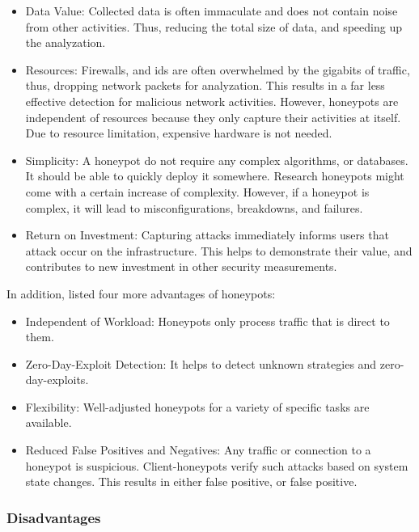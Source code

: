 \begin{itemize}
    \item Data Value: Collected data is often immaculate and does not contain noise from other activities.
          Thus, reducing the total size of data, and speeding up the analyzation.
    \item Resources: Firewalls, and \ac{ids} are often overwhelmed by the gigabits of traffic, thus, dropping network packets for analyzation.
          This results in a far less effective detection for malicious network activities.
          However, honeypots are independent of resources because they only capture their activities at itself.
          Due to resource limitation, expensive hardware is not needed.
    \item Simplicity: A honeypot do not require any complex algorithms, or databases.
          It should be able to quickly deploy it somewhere.
          Research honeypots might come with a certain increase of complexity. However, if a honeypot is complex, it will lead to misconfigurations, breakdowns, and failures.
    \item Return on Investment: Capturing attacks immediately informs users that attack occur on the infrastructure.
          This helps to demonstrate their value, and contributes to new investment in other security measurements.
\end{itemize}

In addition, \citet{NawrockiWSKS2016} listed four more advantages of honeypots:

\begin{itemize}
    \item Independent of Workload: Honeypots only process traffic that is direct to them.
    \item Zero-Day-Exploit Detection: It helps to detect unknown strategies and zero-day-exploits.
    \item Flexibility: Well-adjusted honeypots for a variety of specific tasks are available.
    \item Reduced False Positives and Negatives: Any traffic or connection to a honeypot is suspicious.
          Client-honeypots verify such attacks based on system state changes.
          This results in either false positive, or false positive.
\end{itemize}

\subsubsection{Disadvantages}

